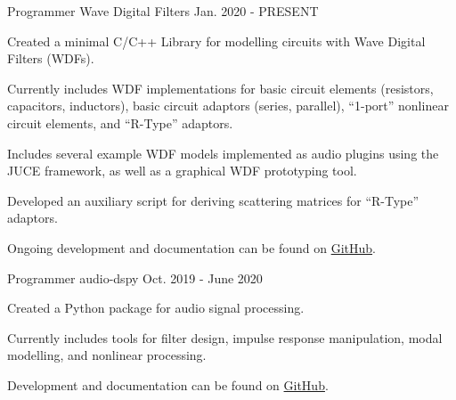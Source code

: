 \begin{cventries}
  \cventry
    {Programmer} %
    {Wave Digital Filters} %
    {} %
    {Jan. 2020 - PRESENT} %
    {
      \begin{cvitems} %
        \item {Created a minimal C/C++ Library for modelling circuits with Wave Digital Filters (WDFs).}
        \item {Currently includes WDF implementations for basic circuit elements (resistors, capacitors, inductors),
               basic circuit adaptors (series, parallel), ``1-port'' nonlinear circuit elements, and ``R-Type'' adaptors.}
        \item {Includes several example WDF models implemented as audio plugins using the JUCE framework,
               as well as a graphical WDF prototyping tool.}
        \item {Developed an auxiliary script for deriving scattering matrices for ``R-Type'' adaptors.}
        \item {Ongoing development and documentation can be found on \href{https://github.com/jatinchowdhury18/WaveDigitalFilters}{GitHub}.}
      \end{cvitems}
    }

  \cventry
    {Programmer} %
    {audio-dspy} %
    {} %
    {Oct. 2019 - June 2020} %
    {
      \begin{cvitems} %
        \item {Created a Python package for audio signal processing.}
        \item {Currently includes tools for filter design, impulse response manipulation, modal modelling, and nonlinear processing.}
        \item {Development and documentation can be found on \href{https://github.com/jatinchowdhury18/audio_dspy}{GitHub}.}
      \end{cvitems}
    }


\end{cventries}
